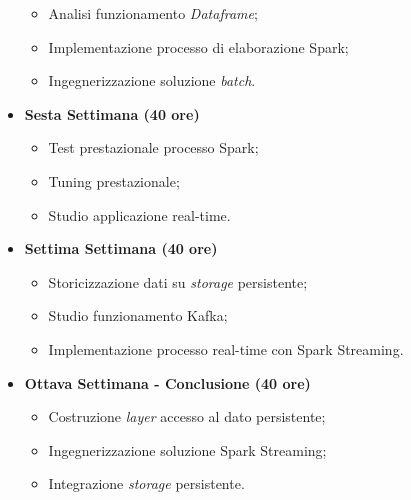 \begin{itemize}
	\begin{itemize}
		\item Analisi funzionamento \emph{Dataframe};
		\item Implementazione processo di elaborazione Spark;
		\item Ingegnerizzazione soluzione \emph{batch}.
	\end{itemize}
	\item[] \textbf{Sesta Settimana (40 ore)} 
	\begin{itemize}
		\item Test prestazionale processo Spark;
		\item Tuning prestazionale;
		\item Studio applicazione real-time.
	\end{itemize}
	\item[] \textbf{Settima Settimana (40 ore)} 
	\begin{itemize}
		\item Storicizzazione dati su \emph{storage} persistente;
		\item Studio funzionamento Kafka;
		\item Implementazione processo real-time con Spark Streaming.
	\end{itemize}
	\item[] \textbf{Ottava Settimana - Conclusione (40 ore)} 
	\begin{itemize}
		\item Costruzione \emph{layer} accesso al dato persistente;
		\item Ingegnerizzazione soluzione Spark Streaming;
		\item Integrazione \emph{storage} persistente.
	\end{itemize}
\end{itemize}

